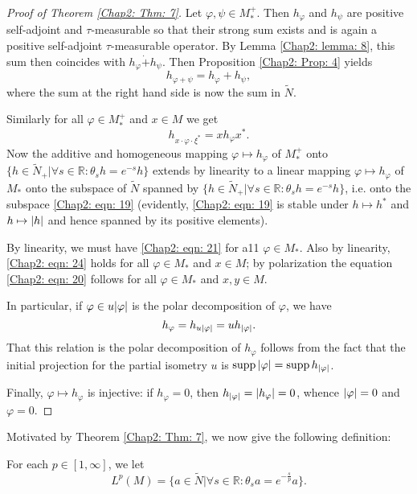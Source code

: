\begin{proof}[Proof of Theorem \ref{Chap2: Thm: 7}]
    Let $\varphi,\psi\in M_*^+$. Then $h_\varphi$ and $h_\psi$ are positive self-adjoint and $\tau$-measurable so that their strong sum exists and is again a positive self-adjoint $\tau$-measurable operator. By Lemma \ref{Chap2: lemma: 8}, this sum then coincides with $h_\varphi\dot{+}h_\psi$. Then Proposition \ref{Chap2: Prop: 4} yields
    \[
        h_{\varphi+\psi}=h_\varphi+h_\psi,
    \]
    where the sum at the right hand side is now the sum in $\tilde{N}$.\par
    Similarly for all $\varphi\in M_*^+$ and $x\in M$ we get
    \begin{equation}\label{Chap2: eqn: 24}
        h_{x\cdot \varphi\cdot \xi^*}=xh_\varphi x^*.
    \end{equation}
    Now the additive and homogeneous mapping $\varphi\mapsto h_\varphi$ of $M_*^+$ onto $\{h\in \tilde{N}_+|\forall s\in \mathbb{R}:\theta_sh=e^{-s}h\}$ extends by linearity to a linear mapping $\varphi\mapsto h_\varphi$ of $M_*$ onto the subspace of $\tilde{N}$ spanned by $\{h\in \tilde{N}_+|\forall s\in \mathbb{R}:\theta_sh=e^{-s}h\}$, i.e. onto the subspace \eqref{Chap2: eqn: 19} (evidently, \eqref{Chap2: eqn: 19} is stable under $h\mapsto h^*$ and $h\mapsto\abs{h}$ and hence spanned by its positive elements).\par
    By linearity, we must have \eqref{Chap2: eqn: 21} for a11 $\varphi\in M_*$. Also by linearity, \eqref{Chap2: eqn: 24} holds for all $\varphi\in M_*$ and $x\in M$; by polarization the equation \eqref{Chap2: eqn: 20} follows for all $\varphi\in M_*$ and $x,y\in M$.\par
    In particular, if $\varphi\in u\abs{\varphi}$ is the polar decomposition of $\varphi$, we have
    \[
        h_\varphi=h_{u\abs{\varphi}}=uh_{\abs{\varphi}}.
    \]
    That this relation is the polar decomposition of $h_\varphi$ follows from the fact that the initial projection for the partial isometry $u$ is $\operatorname{supp} \abs{\varphi}=\operatorname{supp} h_\abs{\varphi}$.\par
    Finally, $\varphi\mapsto h_\varphi$ is injective: if $h_\varphi=0$, then $h_{\abs{\varphi}}=\abs{h_\varphi}=0$, whence $\abs{\varphi}=0$ and $\varphi=0$.
\end{proof}
Motivated by Theorem \ref{Chap2: Thm: 7}, we now give the following definition:
\begin{definition}\label{Chap2: Def: 9}
    For each $p\in [1,\infty]$, we let
    \[
        L^p(M)=\{a\in \tilde{N}|\forall s\in \mathbb{R}:\theta_s a=e^{-\frac{s}{p}}a\}.
    \]
\end{definition}
